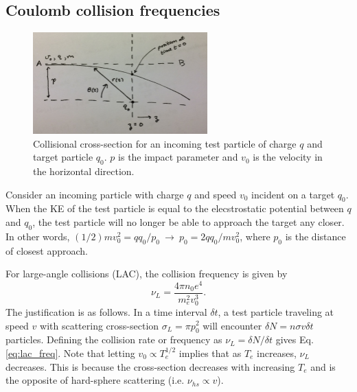 	\subsection{Coulomb collision frequencies}
	\begin{figure}
		\centering
		\includegraphics[width=0.6\textwidth]{figures/collisions.png}
		\caption{Collisional cross-section for an incoming test particle of charge $q$ and target particle $q_0$. $p$ is the impact parameter and $v_0$ is the velocity in the horizontal direction.}
		\label{fig:collisions}
	\end{figure}

	Consider an incoming particle with charge $q$ and speed $v_0$ incident on a target $q_0$. When the KE of the test particle is equal to the elecstrostatic potential between $q$ and $q_0$, the test particle will no longer be able to approach the target any closer. In other words, $(1/2)mv_0^2=qq_0/p_0~\rightarrow~p_0=2qq_0/mv_0^2$, where $p_0$ is the distance of closest approach.

	For large-angle collisions (LAC), the collision frequency is given by 
	\begin{equation}
		\label{eq:lac_freq}
		\nu_L=\frac{4\pi n_0e^4}{m_e^2v_0^3}.
	\end{equation}
	The justification is as follows. In a time interval $\delta t$, a test particle traveling at speed $v$ with scattering cross-section $\sigma_L=\pi p_0^2$ will encounter $\delta N=n\sigma v\delta t$ particles. Defining the collision rate or frequency as $\nu_L=\delta N/\delta t$ gives Eq. \ref{eq:lac_freq}. Note that letting $v_0\propto T_e^{1/2}$ implies that as $T_e$ increases, $\nu_L$ decreases. This is because the cross-section decreases with increasing $T_e$ and is the opposite of hard-sphere scattering (i.e. $\nu_{hs}\propto v$).


